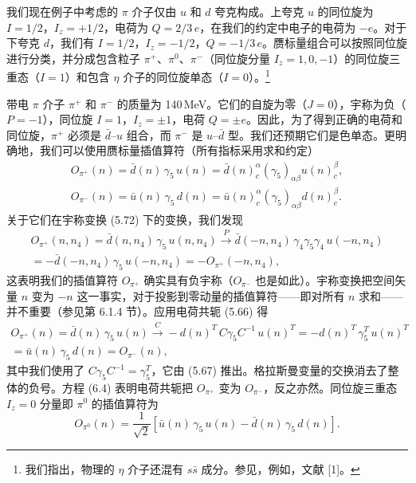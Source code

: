 我们现在例子中考虑的 $\pi$ 介子仅由 $u$ 和 $d$ 夸克构成。上夸克 $u$ 的同位旋为 $I = 1/2$，$I_z = +1/2$，电荷为 $Q = 2/3\,e$，在我们的约定中电子的电荷为 $-e$。对于下夸克 $d$，我们有 $I = 1/2$，$I_z = -1/2$，$Q = -1/3\,e$。赝标量组合可以按照同位旋进行分类，并分成包含粒子 $\pi^+$、$\pi^0$、$\pi^-$（同位旋分量 $I_z = 1, 0, -1$）的同位旋三重态（$I = 1$）和包含 $\eta$ 介子的同位旋单态（$I = 0$）。\footnote{我们指出，物理的 $\eta$ 介子还混有 $s\bar s$ 成分。参见，例如，文献 [1]。}

带电 $\pi$ 介子 $\pi^+$ 和 $\pi^-$ 的质量为 140\,MeV。它们的自旋为零（$J = 0$），宇称为负（$P = -1$），同位旋 $I = 1$，$I_z = \pm 1$，电荷 $Q = \pm e$。因此，为了得到正确的电荷和同位旋，$\pi^+$ 必须是 $\bar d$--$u$ 组合，而 $\pi^-$ 是 $u$--$\bar d$ 型。我们还预期它们是色单态。更明确地，我们可以使用赝标量插值算符（所有指标采用求和约定）
\begin{equation}
  \begin{gathered}
    O_{\pi^+}(n) = \bar d(n)\, \gamma_5\, u(n)
      = \bar d(n)^\alpha_c (\gamma_5)_{\alpha\beta} u(n)^\beta_c , \\
    O_{\pi^-}(n) = \bar u(n)\, \gamma_5\, d(n)
      = \bar u(n)^\alpha_c (\gamma_5)_{\alpha\beta} d(n)^\beta_c .
  \end{gathered}
\end{equation}
关于它们在宇称变换 (5.72) 下的变换，我们发现
\begin{multline}
  O_{\pi^+}(n, n_4) = \bar d(n, n_4)\, \gamma_5\, u(n, n_4)
  \xrightarrow{\;P\;}
  \bar d(-n, n_4)\, \gamma_4\gamma_5\gamma_4\, u(-n, n_4) \\
  = -\bar d(-n, n_4)\, \gamma_5\, u(-n, n_4)
  = -O_{\pi^+}(-n, n_4) ,
\end{multline}
这表明我们的插值算符 $O_{\pi^+}$ 确实具有负宇称（$O_{\pi^-}$ 也是如此）。宇称变换把空间矢量 $n$ 变为 $-n$ 这一事实，对于投影到零动量的插值算符——即对所有 $n$ 求和——并不重要（参见第 6.1.4 节）。应用电荷共轭 (5.66) 得
\begin{multline}
  O_{\pi^+}(n) = \bar d(n)\, \gamma_5\, u(n)
  \xrightarrow{\;C\;}
  -d(n)^T\, C\gamma_5 C^{-1}\, u(n)^T
  = -d(n)^T\, \gamma_5^T\, u(n)^T \\
  = \bar u(n)\, \gamma_5\, d(n) = O_{\pi^-}(n) ,
\end{multline}
其中我们使用了 $C\gamma_5 C^{-1} = \gamma_5^T$，它由 (5.67) 推出。格拉斯曼变量的交换消去了整体的负号。方程 (6.4) 表明电荷共轭把 $O_{\pi^+}$ 变为 $O_{\pi^-}$，反之亦然。同位旋三重态 $I_z = 0$ 分量即 $\pi^0$ 的插值算符为
\begin{equation}
  O_{\pi^0}(n) = \frac{1}{\sqrt{2}}\left[ \bar u(n)\, \gamma_5\, u(n)
    - \bar d(n)\, \gamma_5\, d(n) \right].
\end{equation}

